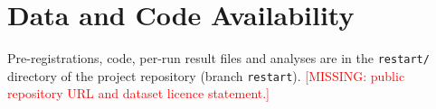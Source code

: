 \documentclass[journal]{IEEEtran}
\newcommand{\missing}[1]{\textcolor{red}{[MISSING: #1]}}
\begin{document}
\section*{Data and Code Availability}
Pre-registrations, code, per-run result files and analyses are in the \texttt{restart/} directory of
the project repository (branch \texttt{restart}). \missing{public repository URL and dataset licence
statement.}



\end{document}
